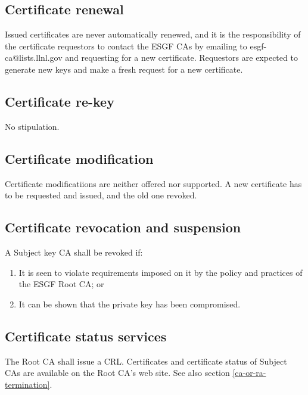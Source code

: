 \subsection{Certificate renewal}\label{certificate-renewal}

Issued certificates are never automatically renewed, and it is the responsibility of the certificate requestors to contact the ESGF CAs by emailing to esgf-ca@lists.llnl.gov and requesting for a new certificate. Requestors are expected to generate new keys and make a fresh request for a new certificate.

\subsection{Certificate re-key}
No stipulation.

\subsection{Certificate modification}
Certificate modificatiions are neither offered nor supported. A new certificate has to be requested and issued, and the old one revoked.

\subsection{Certificate revocation and suspension}\label{certificate-revocation-and-suspension}

A Subject key CA shall be revoked if:

\begin{enumerate}
\item
  
  It is seen to violate requirements imposed on it by the policy and
  practices of the ESGF Root CA; or
  
\item
  
  It can be shown that the private key has been compromised.
  
\end{enumerate}

\subsection{Certificate status services}\label{certificate-status-services}

The Root CA shall issue a CRL. Certificates and certificate status of
Subject CAs are available on the Root CA's web site. See also section
\ref{ca-or-ra-termination}.

